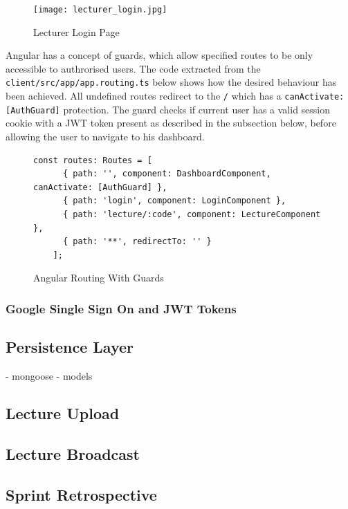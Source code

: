 \begin{figure}[h!]
    \centering
    \texttt{[image: lecturer\_login.jpg]}
    \caption{Lecturer Login Page}
    \label{fig:lecturerlogin}
\end{figure}

Angular has a concept of guards, which allow specified routes to be only accessible to
authrorised users. The code extracted from the \texttt{client/src/app/app.routing.ts} below
shows how the desired behaviour has been achieved. All undefined routes redirect to the \texttt{/}
which has a \texttt{canActivate: [AuthGuard]} protection. The guard checks if current user has a
valid session cookie with a JWT token\cite{44} present as described in the subsection below, before allowing
the user to navigate to his dashboard.

\begin{figure}[h!]
    \begin{lstlisting}[basicstyle=\small]
    const routes: Routes = [
      { path: '', component: DashboardComponent, canActivate: [AuthGuard] },
      { path: 'login', component: LoginComponent },
      { path: 'lecture/:code', component: LectureComponent },
      { path: '**', redirectTo: '' }
    ];
    \end{lstlisting}
    \caption{Angular Routing With Guards}
    \label{fig:auth}
\end{figure}

\subsubsection{Google Single Sign On and JWT Tokens}


\subsection{Persistence Layer}
- mongoose
- models

\subsection{Lecture Upload}

\subsection{Lecture Broadcast}

\subsection{Sprint Retrospective}


